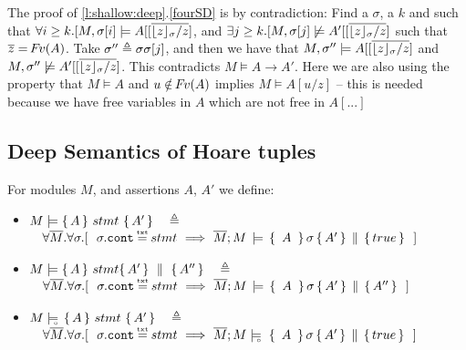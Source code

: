 {\noindent
{The proof of \ref{l:shallow:deep}.\ref{fourSD} is by contradiction: Find a $\sigma$, a $k$ and   such that  
$\forall i\geq k.[M,{\sigma[i]} \models A[[\overline{ {{\lfloor z \rfloor_{\sigma}}/ z}}]$, and
$\exists j\geq k.[M,{\sigma[j]} \not\models A'[[\overline{ {{\lfloor z \rfloor_{\sigma}}/ z}}]$
 such that $\overline z = {\hspace{-1pt}F\hspace{-1pt}}v(A)$.
 Take $\sigma''\triangleq \sigma \sigma[j]$, and then we have that
 $M, \sigma'' \models A[[\overline{ {{\lfloor z \rfloor_{\sigma}}/ z}}]$ and  $M,  \sigma'' \not\models A'[[\overline{ {{\lfloor z \rfloor_{\sigma}}/ z}}]$.
 This contradicts $ M  \models A \rightarrow A'$.
 Here we are also using the property that $M \models A$  and $u\notin {\hspace{-1pt}F\hspace{-1pt}}v(A)$ implies $M \models A[u/z]$ -- this is needed because we have free variables in $A$ which are not free in $A[...]$}
 {}
 {}

\subsection{Deep Semantics of Hoare tuples}
 \begin{definition}
\label{def:hoare:sem}
 
For modules $M$, and assertions $A$, $A'$   we define:
\begin{itemize}
\item
\label{def:hoare:sem:one}
$M \models   \{\, A \,  \}\ stmt\  \{\, A' \, \}\ \ \ \triangleq$\\
{$\strut  \ \ \ \forall    \Mtwo. \forall  \sigma.[ \ \   %
 \sigma.\prg{cont}\txteq stmt\   \Longrightarrow \ 
{\satAssertQuadruple  \Mtwo  M   {\  A\ }  \sigma  { A'  } {true} } \ \ ]$%
}
 \item
 \label{def:hoare:sem:two}
$M \models  \{\, A \, \}\ stmt \{\, A' \, \} \, \,\parallel\,\, \{\, A'' \, \}   \ \ \  \triangleq$ \\
{$\strut  \ \ \  \forall    \Mtwo. \forall  \sigma.[ \  \  \sigma.\prg{cont}\txteq stmt\   \Longrightarrow \ 
{\satAssertQuadruple  \Mtwo  M    {\  A\ }  \sigma  { A'  } {A''} } \ \ ]$%
}
\item
\label{def:hoare:sem:three}
$M \models\!\!\!\!_{_{\circ}}\    \{\, A \,  \}\ stmt\  \{\, A' \, \}  \ \ \ \triangleq$\\
{$\strut  \ \ \ \forall    \Mtwo. \forall  \sigma.[ \ \   %
 \sigma.\prg{cont}\txteq stmt\   \Longrightarrow \ 
{\satDAssertQuadrupleFrom \Mtwo  M  \sigma   {\  A\ } { A'  } {true} } \ \ ]$%
}
 

\end{itemize}
\end{definition}}
